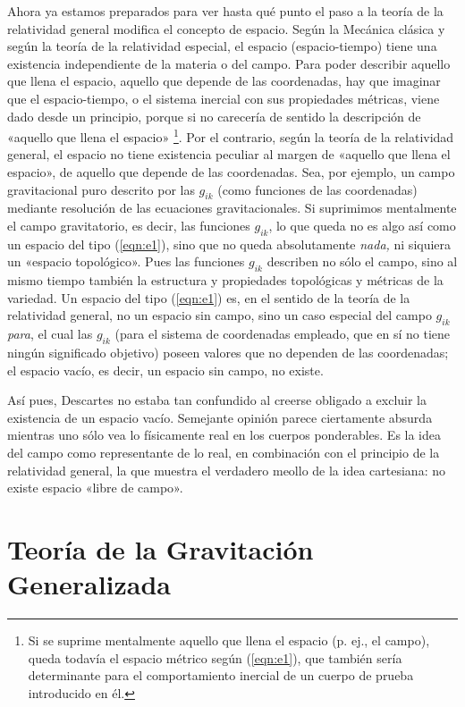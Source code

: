 \documentclass[spanish]{book}
\begin{document}
Ahora ya estamos preparados para ver hasta qué punto el paso a la teoría de la
relatividad general modifica el concepto de espacio. Según la Mecánica clásica y según
la teoría de la relatividad especial, el espacio (espacio-tiempo) tiene una existencia
independiente de la materia o del campo. Para poder describir aquello que llena el
espacio, aquello que depende de las coordenadas, hay que imaginar que el espacio-tiempo,
o el sistema inercial con sus propiedades métricas, viene dado desde un
principio, porque si no carecería de sentido la descripción de «aquello que llena el
espacio» \footnote{Si se suprime mentalmente aquello que llena el espacio (p. ej., el campo),
queda todavía el espacio métrico según (\ref{eqn:e1}), que también sería determinante 
para el comportamiento inercial de un cuerpo de prueba introducido en él.}. Por el contrario,
según la teoría de la relatividad general, el espacio no tiene
existencia peculiar al margen de «aquello que llena el espacio», de aquello que
depende de las coordenadas. Sea, por ejemplo, un campo gravitacional puro descrito
por las $g_{ik}$ (como funciones de las coordenadas) mediante resolución de las ecuaciones
gravitacionales. Si suprimimos mentalmente el campo gravitatorio, es decir, las
funciones $g_{ik}$, lo que queda no es algo así como un espacio del tipo (\ref{eqn:e1}), sino que no
queda absolutamente \textit{nada,} ni siquiera un «espacio topológico». Pues las funciones $g_{ik}$
describen no sólo el campo, sino al mismo tiempo también la estructura y propiedades
topológicas y métricas de la variedad. Un espacio del tipo (\ref{eqn:e1}) es, en el sentido de la
teoría de la relatividad general, no un espacio sin campo, sino un caso especial del
campo $g_{ik}$ \textit{para}, el cual las $g_{ik}$ (para el sistema de coordenadas empleado, que en sí no
tiene ningún significado objetivo) poseen valores que no dependen de las coordenadas;
el espacio vacío, es decir, un espacio sin campo, no existe.

Así pues, Descartes no estaba tan confundido al creerse obligado a excluir la
existencia de un espacio vacío. Semejante opinión parece ciertamente absurda
mientras uno sólo vea lo físicamente real en los cuerpos ponderables. Es la idea del
campo como representante de lo real, en combinación con el principio de la relatividad
general, la que muestra el verdadero meollo de la idea cartesiana: no existe espacio
«libre de campo».


\section{Teoría de la Gravitación Generalizada}
\end{document}
